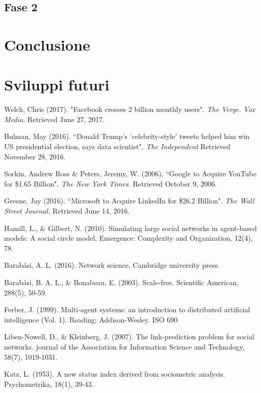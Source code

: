 \documentclass[a4paper,12pt]{article}
\begin{document}
\subsection{Fase 2}
\section{Conclusione}
\label{sec:end}
\section{Sviluppi futuri}
\label{sec:future}


\begin{thebibliography}{9}
  Welch, Chris (2017). "Facebook crosses 2 billion monthly users". \textit{The Verge. Vox Media.} Retrieved June 27, 2017.
  
  Bulman, May (2016). ``Donald Trump's 'celebrity-style' tweets helped him win US presidential election, says data scientist".
\textit{The Independent} Retrieved November 28, 2016.

   Sorkin, Andrew Ross \& Peters, Jeremy, W. (2006). ``Google to Acquire YouTube for \$1.65 Billion". \textit{The New York Times.} Retrieved October 9, 2006.

   Greene, Jay (2016). ``Microsoft to Acquire LinkedIn for \$26.2 Billion". \textit{The Wall Street Journal.} Retrieved June 14, 2016.

  Hamill, L., \& Gilbert, N. (2010). Simulating large social networks in agent-based models: A social circle model. Emergence: Complexity and Organization, 12(4), 78.

  Barabási, A. L. (2016). Network science. Cambridge university press.
  
  Barabási, B. A. L., \& Bonabeau, E. (2003). Scale-free. Scientific American, 288(5), 50-59.
  
  Ferber, J. (1999). Multi-agent systems: an introduction to distributed artificial intelligence (Vol. 1). Reading: Addison-Wesley.
ISO 690	

  Liben-Nowell, D., \& Kleinberg, J. (2007). The link-prediction problem for social networks. journal of the Association for Information Science and Technology, 58(7), 1019-1031.
  
  Katz, L. (1953). A new status index derived from sociometric analysis. Psychometrika, 18(1), 39-43.


\end{thebibliography}
\end{document}
